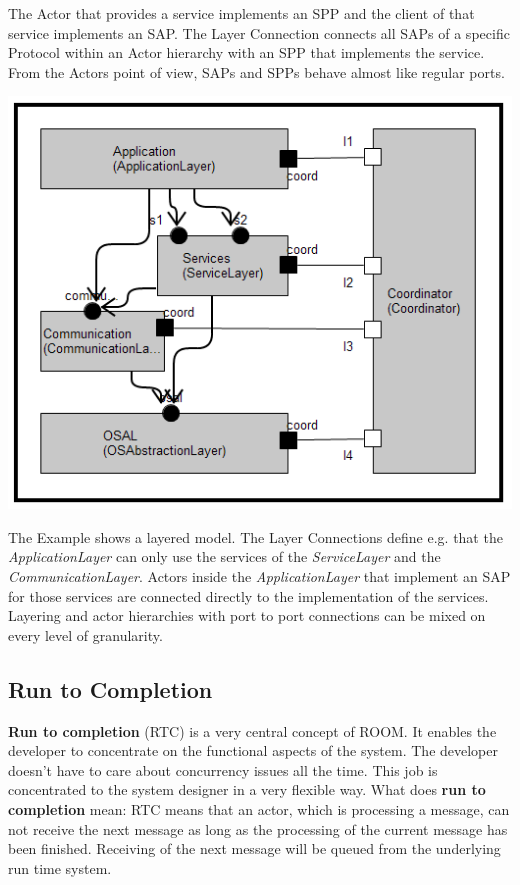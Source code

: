 The Actor that provides a service implements an SPP and the client of that service implements an SAP. The Layer Connection connects all SAPs of a specific Protocol within an Actor hierarchy with an SPP that implements the service. From the Actors point of view, SAPs and SPPs behave almost like regular ports.

\includegraphics{images/010-LayerExample.png}

The Example shows a layered model. The Layer Connections define e.g. that the \textit{ApplicationLayer} can only use the services of the \textit{ServiceLayer} and the \textit{CommunicationLayer}. Actors inside the \textit{ApplicationLayer} that implement an SAP for those services are connected directly to the implementation of the services. 
Layering and actor hierarchies with port to port connections can be mixed on every level of granularity. 

\subsection{Run to Completion}

\textbf{Run to completion} (RTC) is a very central concept of ROOM. It enables the developer to concentrate on the functional aspects of the system. The developer doesn't have to care about concurrency issues all the time. This job is concentrated to the system designer in a very flexible way.
What does \textbf{run to completion} mean:
RTC means that an actor, which is processing a message, can not receive the next message as long as the processing of the current message has been finished. Receiving of the next message will be queued from the underlying run time system.

